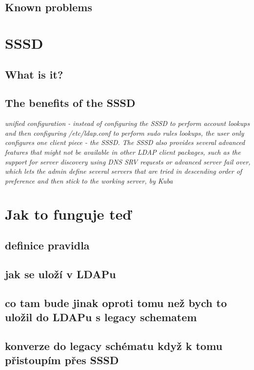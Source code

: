 \documentclass[12pt,a4paper,titlepage,final]{article}
\begin{document}
\subsection{Known problems}


\section{SSSD}
\subsection{What is it?}

\subsection{The benefits of the SSSD}
\textit{unified configuration - instead of configuring the SSSD to perform account
lookups and then configuring /etc/ldap.conf to perform sudo rules lookups, the
user only configures one client piece - the SSSD. The SSSD also provides several
advanced features that might not be available in other LDAP client packages,
such as the support for server discovery using DNS SRV requests or advanced
server fail over, which lets the admin define several servers that are tried in
descending order of preference and then stick to the working server, by Kuba}

\section{Jak to funguje teď}
\subsection{}
\subsection{definice pravidla}
\subsection{jak se uloží v LDAPu}
\subsection{co tam bude jinak oproti tomu než bych to uložil do LDAPu s legacy schematem}
\subsection{konverze do legacy schématu když k tomu přistoupím přes SSSD}
\end{document}
